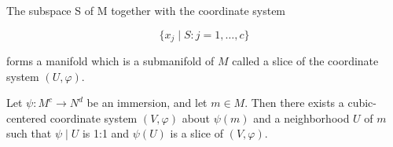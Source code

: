 The subspace S of M together with the coordinate system

\begin{equation}
	\tag{2}\label{eq:1.34:2}
	\{x_{j}\mid S\colon j=1,\ldots,c\}
\end{equation}

forms a manifold which is a submanifold of $M$ called a slice of the coordinate system $(U, \varphi)$.



\begin{proposition}\label{thm:1.35}
	Let $\psi: M^{c} \to N^{d}$ be an immersion, and let $m \in M$. Then there exists a cubic-centered coordinate system $(V, \varphi)$ about $\psi(m)$ and a neighborhood $U$ of $m$ such that $\psi \mid U$ is 1:1 and $\psi(U)$ is a slice of $(V, \varphi)$. 

\end{proposition}

